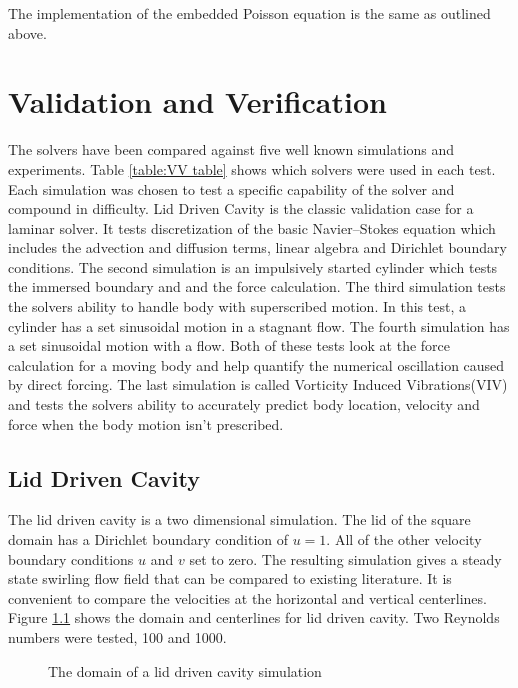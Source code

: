 \documentclass[onehalf,11pt]{beavtex}
\begin{document}
The implementation of the embedded Poisson equation is the same as outlined above.


\chapter{Validation and Verification}\label{Validation}
The solvers have been compared against five well known simulations and experiments.
Table \ref{table:VV table} shows which solvers were used in each test.
Each simulation was chosen to test a specific capability of the solver and compound in difficulty.
Lid Driven Cavity is the classic validation case for a laminar solver.
It tests discretization of the basic Navier--Stokes equation which includes the advection and diffusion terms, linear algebra and Dirichlet boundary conditions.
The second simulation is an impulsively started cylinder which tests the immersed boundary and and the force calculation.
The third simulation tests the solvers ability to handle body with superscribed motion.
In this test, a cylinder has a set sinusoidal motion in a stagnant flow.
The fourth simulation has a set sinusoidal motion with a flow.
Both of these tests look at the force calculation for a moving body and help quantify the numerical oscillation caused by direct forcing. 
The last simulation is called Vorticity Induced Vibrations(VIV) and tests the solvers ability to accurately predict body location, velocity and force when the body motion isn't prescribed.

\section{Lid Driven Cavity}
The lid driven cavity is a two dimensional simulation.
The lid of the square domain has a Dirichlet boundary condition of $u=1$. 
All of the other velocity boundary conditions $u$ and $v$ set to zero.
The resulting simulation gives a steady state swirling flow field that can be compared to existing literature.
It is convenient to compare the velocities at the horizontal and vertical centerlines.
Figure \ref{fig:lid driven cavity} shows the domain and centerlines for lid driven cavity.
Two Reynolds numbers were tested, 100 and 1000.
\begin{figure}[h]
	\centering
	
	\caption{The domain of a lid driven cavity simulation}
	\label{fig:lid driven cavity}
\end{figure}
\end{document}
